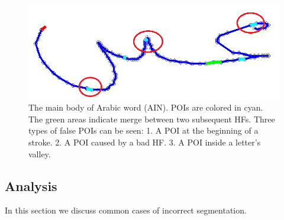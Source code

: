 \documentclass[10pt, conference, compsocconf]{IEEEtran}
\begin{document}

\begin{figure}
\centering
\includegraphics[width=0.5\columnwidth]{./figures/candidate_in_no_horizontal}
\caption{The main body of Arabic word  (AIN). POIs are colored in cyan. 
The green areas indicate merge between two subsequent HFs. 
Three types of false POIs can be seen: 
1. A POI at the beginning of a stroke. 
2. A POI caused by a bad HF. 
3. A POI inside a letter's valley. }
\label{fig:candidate_in_no_horizontal}
\vspace{-10pt}
\end{figure}

\subsection{Analysis}
In this section we discuss common cases of incorrect segmentation.\\
\end{document}
